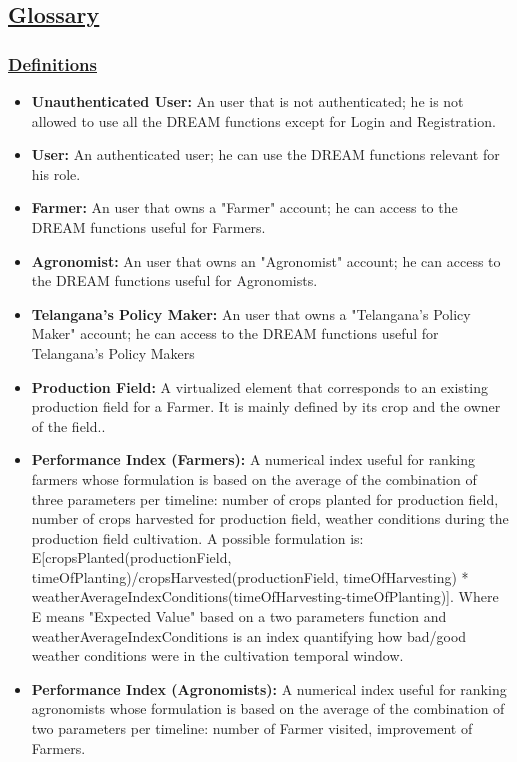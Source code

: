 		\vspace{1cm}

\subsection[Glossary]{\hyperlink{toc}{Glossary}}
	\label{sec:glossary}
	
	\subsubsection[Definitions]{\hyperlink{toc}{Definitions}}
		\begin{itemize}
			\item \textbf{Unauthenticated User:} An user that is not authenticated; he is not allowed to use all the DREAM functions except for Login and Registration.
			\item \textbf{User:} An authenticated user; he can use the DREAM functions relevant for his role.
			\item \textbf{Farmer:} An user that owns a "Farmer" account; he can access to the DREAM functions useful for Farmers.
			\item \textbf{Agronomist:} An user that owns an "Agronomist" account; he can access to the DREAM functions useful for Agronomists.
			\item \textbf{Telangana's Policy Maker:} An user that owns a "Telangana's Policy Maker" account; he can access to the DREAM functions useful for Telangana's Policy Makers
			\item \textbf{Production Field:} A virtualized element that corresponds to an existing production field for a Farmer. It is mainly defined by its crop and the owner of the field..
			\item \textbf{Performance Index (Farmers):} A numerical index useful for ranking farmers whose formulation is based on the average of the combination of three parameters per timeline: number of crops planted for production field, number of crops harvested for production field, weather conditions during the production field cultivation. A possible formulation is: E[cropsPlanted(productionField, timeOfPlanting)/cropsHarvested(productionField, timeOfHarvesting) * weatherAverageIndexConditions(timeOfHarvesting-timeOfPlanting)]. Where E means "Expected Value" based on a two parameters function and weatherAverageIndexConditions is an index quantifying how bad/good weather conditions were in the cultivation temporal window.
			\item \textbf{Performance Index (Agronomists):} A numerical index useful for ranking agronomists whose formulation is based on the average of the combination of two parameters per timeline: number of Farmer visited, improvement of Farmers.

\end{itemize}
